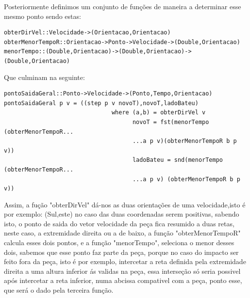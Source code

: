 \documentclass[a4paper]{report} %
\begin{document}
Posteriormente definimos um conjunto de funções de maneira a determinar esse mesmo ponto sendo estas:
\begin{verbatim}
obterDirVel::Velocidade->(Orientacao,Orientacao)
obterMenorTempoR::Orientacao->Ponto->Velocidade->(Double,Orientacao)
menorTempo::(Double,Orientacao)->(Double,Orientacao)->(Double,Orientacao)
\end{verbatim}
Que culminam na seguinte:
\begin{verbatim}
pontoSaidaGeral::Ponto->Velocidade->(Ponto,Tempo,Orientacao)
pontoSaidaGeral p v = ((step p v novoT),novoT,ladoBateu)
                               where (a,b) = obterDirVel v
                                     novoT = fst(menorTempo (obterMenorTempoR...
                                     ...a p v)(obterMenorTempoR b p v))
                                     ladoBateu = snd(menorTempo (obterMenorTempoR... 
                                     ...a p v) (obterMenorTempoR b p v))
\end{verbatim}
Assim, a fução "obterDirVel" dá-nos as duas orientações de uma velocidade,isto é por exemplo: (Sul,este) no caso das duas coordenadas serem positivas, sabendo isto, o ponto de saida do vetor velocidade da peça fica resumido a duas retas, neste caso, a extremidade direita ou a de baixo, a função "obterMenorTempoR" calcula esses dois pontos, e a função "menorTempo", seleciona o menor desses dois, sabemos que esse ponto faz parte da peça, porque no caso do impacto ser feito fora da peça, isto é por exemplo, intercetar a reta definida pela extremidade direita a uma altura inferior ás validas na peça, essa interseção só seria possivel após intercetar a reta inferior, numa abcissa compativel com a peça, ponto esse, que será o dado pela terceira função.
\end{document}
